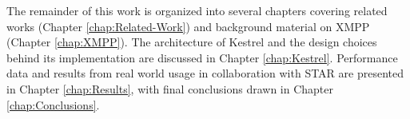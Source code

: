 The remainder of this work is organized into several chapters covering related
works (Chapter \ref{chap:Related-Work}) and background material on XMPP (Chapter
\ref{chap:XMPP}). The architecture of Kestrel and the design choices behind
its implementation are discussed in Chapter \ref{chap:Kestrel}. Performance
data and results from real world usage in collaboration with STAR are presented
in Chapter \ref{chap:Results}, with final conclusions drawn in Chapter
\ref{chap:Conclusions}.



